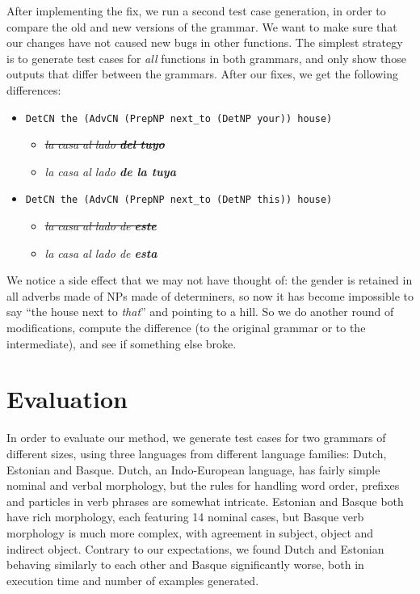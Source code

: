 \documentclass[11pt]{article}
\def\t#1{\texttt{#1}}
\begin{document}
After implementing the fix, we run a second test case generation, in
order to compare the old and new versions of the grammar. We want to
make sure that our changes have not caused new bugs in other
functions. The simplest strategy is to generate test cases for
\emph{all} functions in both grammars, and only show those outputs
that differ between the grammars. After our fixes, we get the
following differences:

\begin{itemize}
\setlength\itemsep{0em}
\item[] \t{DetCN the (AdvCN (PrepNP next\_to (DetNP your)) house)}
  \begin{itemize}
   \item \emph{\sout{la casa al lado {\bf  del tuyo}}}
   \item \emph{la casa al lado {\bf  de la tuya}}
  \end{itemize}
\item[] \t{DetCN the (AdvCN (PrepNP next\_to (DetNP this)) house)}
  \begin{itemize}
   \item \emph{\sout{la casa al lado de {\bf este}}}
   \item \emph{la casa al lado de {\bf esta}}
  \end{itemize}
\end{itemize}

\noindent We notice a side effect that we may not have thought of: the
gender is retained in all adverbs made of NPs made of determiners, so
now it has become impossible to say ``the house next to \emph{that}'' and
pointing to a hill. So we do another round of modifications, compute
the difference (to the original grammar or to the intermediate), and
see if something else broke.

\section{Evaluation}

In order to evaluate our method, we generate test cases for two
grammars of different sizes, using three languages from different
language families: Dutch, Estonian and Basque. Dutch, an Indo-European
language, has fairly simple nominal and verbal morphology, but the
rules for handling word order, prefixes and particles in verb phrases
are somewhat intricate. Estonian and Basque both have rich morphology,
each featuring 14 nominal cases, but Basque verb morphology is much
more complex, with agreement in subject, object and indirect
object. Contrary to our expectations, we found Dutch and Estonian
behaving similarly to each other and Basque significantly worse, both
in execution time and number of examples generated. 
\end{document}
